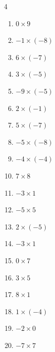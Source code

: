 \begin{multicols}{4}
\begin{enumerate}
  \item $0\times 9$
        \phantom{$=0$}

  \item $-1\times (-8)$
        \phantom{$=8$}

  \item $6\times (-7)$
        \phantom{$=-42$}

\columnbreak %

  \item $3\times (-5)$
        \phantom{$=-15$}

  \item $-9\times (-5)$
        \phantom{$=45$}

  \item $2\times (-1)$
        \phantom{$=-2$}

  \item $5\times (-7)$
        \phantom{$=-35$}

  \item $-5\times (-8)$
        \phantom{$=40$}

  \item $-4\times (-4)$
        \phantom{$=16$}

  \item $7\times 8$
        \phantom{$=56$}

  \item $-3\times 1$
        \phantom{$=-3$}

  \item $-5\times 5$
        \phantom{$=-25$}

  \item $2\times (-5)$
        \phantom{$=-10$}

  \item $-3\times 1$
        \phantom{$=-3$}

  \item $0\times 7$
        \phantom{$=0$}

  \item $3\times 5$
        \phantom{$=15$}

  \item $8\times 1$
        \phantom{$=8$}

  \item $1\times (-4)$
        \phantom{$=-4$}

  \item $-2\times 0$
        \phantom{$=0$}

  \item $-7\times 7$
        \phantom{$=-49$}


\end{enumerate}
\end{multicols}
